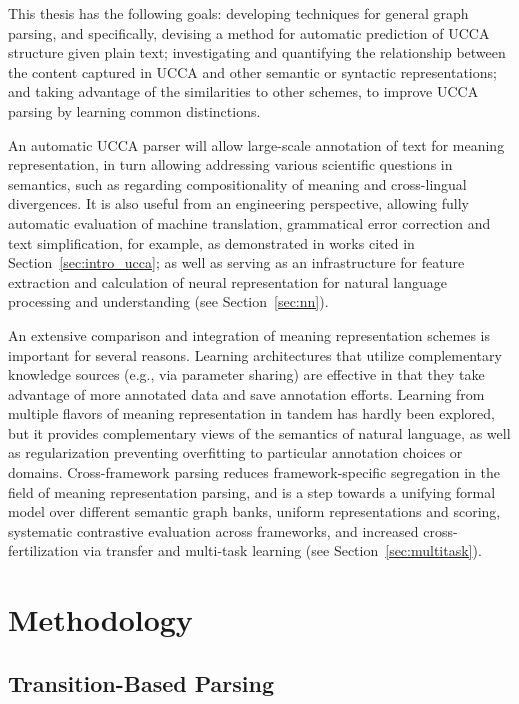 \documentclass[12pt,a4paper,table]{report}
\begin{document}
This thesis has the following goals:
developing techniques for general graph parsing, and
specifically, devising a method for automatic prediction of UCCA
    structure given plain text;
investigating and quantifying the relationship between the content
    captured in UCCA and other semantic or syntactic representations;
and taking advantage of the similarities to other schemes,
    to improve UCCA parsing by learning common distinctions.

An automatic UCCA parser will allow large-scale annotation of text for meaning representation, in turn allowing addressing various scientific questions in semantics, such as regarding compositionality of meaning and cross-lingual divergences. It is also useful from an engineering perspective, allowing fully automatic evaluation of machine translation, grammatical error correction and text simplification, for example, as demonstrated in works cited in Section~\ref{sec:intro_ucca}; as well as serving as an infrastructure for feature extraction and calculation of neural representation for natural language processing and understanding (see Section~\ref{sec:nn}).

An extensive comparison and integration of meaning representation schemes is important for several reasons. Learning architectures that utilize complementary knowledge sources (e.g., via parameter sharing) are effective in that they take advantage of more annotated data and save annotation efforts. Learning from multiple flavors of meaning representation in tandem has hardly been explored, but it provides complementary views of the semantics of natural language, as well as regularization preventing overfitting to particular annotation choices or domains. Cross-framework parsing reduces framework-specific segregation in the field of meaning representation parsing, and is a step towards a unifying formal model over different semantic graph banks, uniform representations and scoring, systematic contrastive evaluation across frameworks, and increased cross-fertilization via transfer and multi-task learning
(see Section~\ref{sec:multitask}).

\chapter{Methodology}

\section{Transition-Based Parsing}\label{sec:transition_based}
\end{document}
